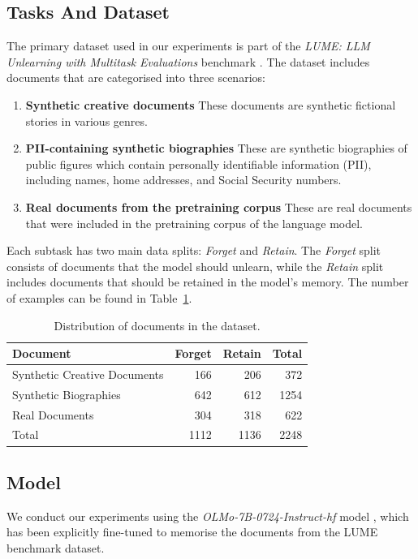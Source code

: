 \documentclass[10pt, a4paper]{article}
\begin{document}
\subsection{Tasks And Dataset}
The primary dataset used in our experiments is part of the \textit{LUME: LLM Unlearning with Multitask Evaluations} benchmark \citep{ramakrishna2025lumellmunlearningmultitask}. The dataset includes documents that are categorised into three scenarios:
\begin{enumerate}[label=(\Roman*)]
    \item \textbf{Synthetic creative documents} These documents are synthetic fictional stories in various genres. 
    \item \textbf{PII-containing synthetic biographies} These are synthetic biographies of public figures which contain personally identifiable information (PII), including names, home addresses, and Social Security numbers.
    \item \textbf{Real documents from the pretraining corpus} These are real documents that were included in the pretraining corpus of the language model. 
\end{enumerate}

Each subtask has two main data splits: \textit{Forget} and \textit{Retain}. The \textit{Forget} split consists of documents that the model should unlearn, while the \textit{Retain} split includes documents that should be retained in the model's memory. The number of examples can be found in Table~\ref{tab:dataset}.
\begin{table}[htbp]
\centering
\caption{Distribution of documents in the dataset.}
\vspace{10pt}
\label{tab:dataset}
\begin{tabular}{lrrr}
\toprule
Document & Forget & Retain & Total  \\ \midrule
Synthetic Creative Documents & 166    & 206    & 372    \\
Synthetic Biographies & 642    & 612    & 1254   \\
Real Documents & 304    & 318    & 622    \\ \midrule
Total    & 1112   & 1136   & 2248   \\ \bottomrule
\end{tabular}
\end{table}

\subsection{Model}
We conduct our experiments using the \textit{OLMo-7B-0724-Instruct-hf} model \citep{groeneveld2024olmo}, which has been explicitly fine-tuned to memorise the documents from the LUME benchmark dataset.
\end{document}
